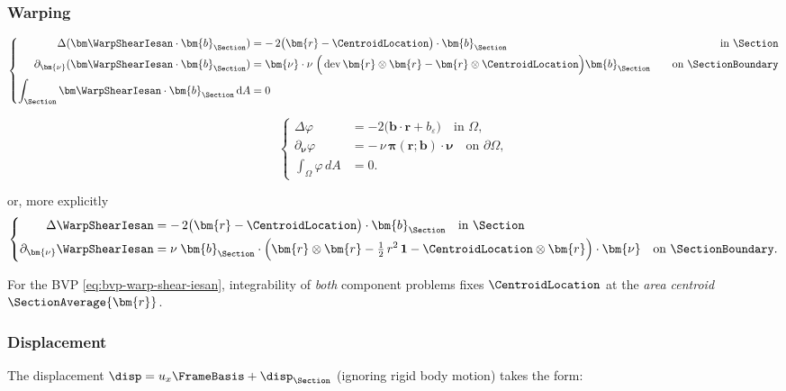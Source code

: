 \subsubsection{Warping}

\begin{equation}
\left\{\begin{aligned}
\Delta (\bm\WarpShearIesan\cdot\bm{b}_{\Section}) &= -\,2\big(\bm{r} -\CentroidLocation\big)\cdot\bm{b}_{\Section} \quad &\text{in } \Section \\
\partial_{\bm{\nu}} (\bm\WarpShearIesan\cdot\bm{b}_{\Section}) &= 
\bm{\nu}\cdot\nu\;\Big(\operatorname{dev}\bm{r}\otimes\bm{r}
 -\bm{r}\otimes\CentroidLocation\Big)\bm{b}_{\Section}
\quad &\text{on } \SectionBoundary \\
\int_{\Section}\bm\WarpShearIesan\cdot\bm{b}_{\Section}\,\mathrm{d}A &= 0
\end{aligned}\right.
\label{eq:bvp-warp-shear-iesan}
\end{equation}


\begin{equation*}
\left\{
\begin{aligned}
\Delta\varphi&=-2\big(\bm{b}\cdot\bm{r}+b_{\varepsilon}\big)\quad\text{in }\Omega,
\\
\partial_{\bm{\nu}}\varphi&=-\,\nu\,\bm{\pi}(\bm{r};\bm{b})\cdot\bm{\nu}\quad\text{on }\partial\Omega,
\\
\int_\Omega \varphi\,dA&=0.
\end{aligned}
\right.
\end{equation*}
%
\begin{Details}
or, more explicitly
%
\begin{equation*}
\left\{\begin{aligned}
\Delta \WarpShearIesan&= -\,2\big(\bm{r} -\CentroidLocation\big)\cdot\bm{b}_{\Section} \quad \text{in } \Section \\
\partial_{\bm{\nu}} \WarpShearIesan &= 
\nu\;\bm{b}_{\Section}\cdot\Big(\bm{r}\otimes\bm{r}
-\tfrac{1}{2}\, r^2\,\mathbf{1}
 -\CentroidLocation\otimes\bm{r}\Big)\cdot\bm{\nu}
\quad \text{on } \SectionBoundary .
\end{aligned}\right.
\end{equation*}
\end{Details}
%
For the BVP
\eqref{eq:bvp-warp-shear-iesan}, integrability of \emph{both} component
problems fixes \(\CentroidLocation\) at the \emph{area centroid}
\(\SectionAverage{\bm{r}}\).
%

\clearpage
\subsubsection{Displacement}
The displacement $\disp = u_x \FrameBasis + \disp_{\Section}$ (ignoring rigid body motion) takes the form:

